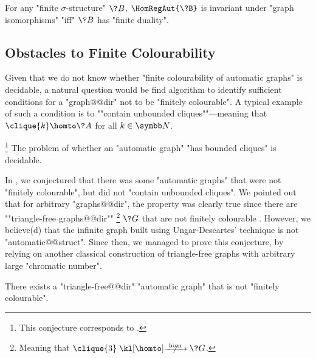 \begin{conjecture}
	\AP\label{conj:invariance-under-graph-isomorphisms}
	For any "finite $\sigma$-structure" $\?B$, $\HomRegAut{\?B}$ is invariant
	under "graph isomorphisms" "iff" $\?B$ has "finite duality".
\end{conjecture}

\subsection{Obstacles to Finite Colourability}

Given that we do not know whether "finite colourability of automatic graphs"
is decidable, a natural question would be find algorithm to identify sufficient conditions
for a "graph@@dir" not to be "finitely colourable". A typical example of such a condition
is to \AP""contain unbounded cliques""---meaning that $\clique{k} \homto \?A$ for all $k\in\N$.

\begin{conjecture}
	\!\footnote{This conjecture corresponds to \cite[Conjecture 7.3]{BarceloFigueiraMorvan2023SeparatingAutomatic}.}
	\AP\label{conj:unbounded-cliques}
    The problem of whether an "automatic graph" "has bounded cliques" is decidable.
\end{conjecture}

In \cite[Conjecture 7.2]{BarceloFigueiraMorvan2023SeparatingAutomatic}, we conjectured
that there was some "automatic graphs" that were not "finitely colourable",
but did not "contain unbounded cliques".
We pointed out that for arbitrary "graphs@@dir", the property was clearly true 
since there are \AP""triangle-free graphs@@dir""%
\footnote{Meaning that $\clique{3} \nothomto \?G$.}
$\?G$ that are not finitely colourable \cite{UngarDescartes1954ChromaticGraphs}.
However, we believe(d) that the infinite graph built using Ungar-Descartes' technique
is not "automatic@@struct".
Since then, we managed to prove this conjecture, by relying on another classical construction of
triangle-free graphs with arbitrary large "chromatic number".

\begin{proposition}
	\AP\label{prop:automatic-graph-not-fin-colourable}
	There exists a "triangle-free@@dir" "automatic graph" that is not "finitely colourable".
\end{proposition}

